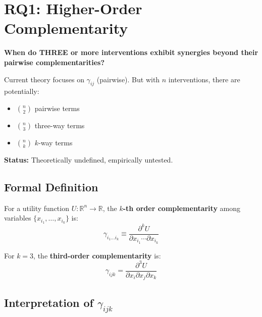 \section{RQ1: Higher-Order Complementarity}
\label{sec:rq1-higher-order}

\begin{tcolorbox}[colback=red!5!white,colframe=red!75!black,title=\textbf{Research Question 1}]
\textbf{When do THREE or more interventions exhibit synergies beyond their pairwise complementarities?}

Current theory focuses on $\gamma_{ij}$ (pairwise). But with $n$ interventions, there are potentially:
\begin{itemize}[noitemsep]
    \item $\binom{n}{2}$ pairwise terms
    \item $\binom{n}{3}$ three-way terms
    \item $\binom{n}{k}$ $k$-way terms
\end{itemize}

\textbf{Status:} Theoretically undefined, empirically untested.
\end{tcolorbox}

\subsection{Formal Definition}

\begin{definition}
For a utility function $U: \mathbb{R}^n \to \mathbb{R}$, the \textbf{$k$-th order complementarity} among variables $\{x_{i_1}, \ldots, x_{i_k}\}$ is:
\begin{equation}
\gamma_{i_1 \ldots i_k} \equiv \frac{\partial^k U}{\partial x_{i_1} \cdots \partial x_{i_k}}
\label{eq:higher-order-gamma}
\end{equation}
\end{definition}

For $k = 3$, the \textbf{third-order complementarity} is:
\begin{equation}
\gamma_{ijk} = \frac{\partial^3 U}{\partial x_i \partial x_j \partial x_k}
\end{equation}

\subsection{Interpretation of $\gamma_{ijk}$}

